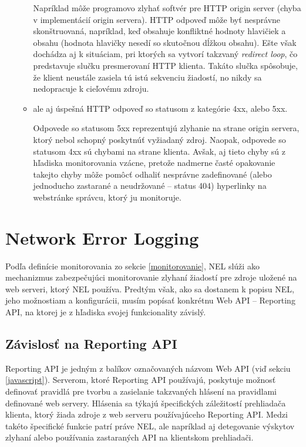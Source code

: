 \begin{enumerate}
\begin{itemize}
        Napríklad môže programovo zlyhať softvér pre HTTP origin server (chyba v implementácií origin servera).
        HTTP odpoveď môže byť nesprávne skonštruovaná, napríklad, keď obsahuje konfliktné hodnoty hlavičiek a obsahu (hodnota hlavičky  nesedí so skutočnou dĺžkou obsahu).  
        Ešte však dochádza aj k situáciam, pri ktorých sa vytvorí takzvaný \textit{redirect loop}, čo predstavuje slučku presmerovaní HTTP klienta. Takáto slučka spôsobuje, že klient neustále zasiela tú istú sekvenciu žiadostí, no nikdy sa nedopracuje k cieľovému zdroju.
        
        \item ale aj úspešná HTTP odpoveď so statusom z kategórie 4xx, alebo 5xx.

        Odpovede so statusom 5xx reprezentujú zlyhanie na strane origin servera, ktorý nebol schopný poskytnúť vyžiadaný zdroj.
        Naopak, odpovede so statusom 4xx sú chybami na strane klienta. 
        Avšak, aj tieto chyby sú z hľadiska monitorovania vzácne, pretože nadmerne časté opakovanie takejto chyby môže pomôcť odhaliť nesprávne zadefinované (alebo jednoducho zastarané a neudržované -- status 404) hyperlinky na webstránke správcu, ktorý ju monitoruje. 
    \end{itemize}
    
\end{enumerate}

\section{Network Error Logging}
\label{network-error-logging}

Podľa definície monitorovania zo sekcie \ref{monitorovanie}, NEL slúži ako mechanizmus
zabezpečujúci monitorovanie zlyhaní žiadostí pre zdroje uložené na web serveri, ktorý NEL používa.
Predtým však, ako sa dostanem k popisu NEL, jeho možnostiam a konfigurácii, musím popísať konkrétnu Web API -- Reporting API, na ktorej je z hľadiska svojej funkcionality závislý.

\subsection{Závislosť na Reporting API}
\label{reporting-api}

Reporting API je jedným z balíkov označovaných názvom Web API (viď sekciu \ref{javascript}).
Serverom, ktoré Reporting API používajú, poskytuje možnosť definovať pravidlá pre 
tvorbu a zasielanie takzvaných hlásení na pravidlami definované web servery.
Hlásenia sa týkajú špecifických záležitostí prehliadača klienta, ktorý žiada zdroje z web serveru používajúceho Reporting API.
Medzi takéto špecifické funkcie patrí práve NEL, ale napríklad aj detegovanie výskytov zlyhaní alebo používania zastaraných API na klientskom prehliadači.

